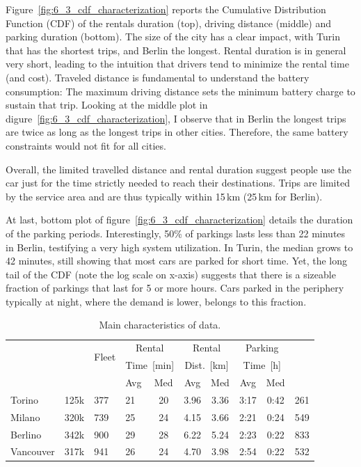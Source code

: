 Figure~\ref{fig:6_3_cdf_characterization} reports the Cumulative Distribution Function (CDF) of the rentals duration (top), driving distance (middle) and parking duration (bottom).
The size of the city has a clear impact, with Turin that has the shortest trips, and Berlin the longest. 
Rental duration is in general very short, leading to the intuition that drivers tend to minimize the rental time (and cost). Traveled distance is fundamental to understand the battery consumption: The maximum driving distance sets the minimum battery charge to sustain that trip. Looking at the middle plot in digure~\ref{fig:6_3_cdf_characterization}, I observe that in Berlin the longest trips are twice as long as the longest trips in other cities. Therefore, the same battery constraints would not fit for all cities. 

Overall, the limited travelled distance and rental duration suggest people use the car just for the time strictly needed to reach their destinations. Trips are limited by the service area and are thus typically within 15\,km (25\,km for Berlin).

At last, bottom plot of figure~\ref{fig:6_3_cdf_characterization} details the duration of the parking periods. Interestingly, 50\% of parkings lasts less than 22 minutes in Berlin, testifying a very high system utilization. In Turin, the median grows to 42 minutes, still showing that most cars are parked for short time. Yet, the long tail of the CDF (note the log scale on x-axis) suggests that there is a sizeable fraction of parkings that last for 5 or more hours. Cars parked in the periphery typically at night, where the demand is lower, belongs to this fraction.
\begin{table}[h!]
\begin{center}
\scriptsize
\caption{Main characteristics of data.\label{tab:6_3_summary}}
\setlength\tabcolsep{5pt} %
\begin{tabular}{|l|l|l|l|c|c|c|c|c|l|}
\hline
\!\multirow{3}{*}{City} &\!\multirow{3}{*}{Rental}\!& \multirow{2}{*}{Fleet} &  \multicolumn{2}{|c|}{Rental}  &  \multicolumn{2}{|c|}{Rental}  &  \multicolumn{2}{|c|}{Parking}  &\!\multirow{3}{*}{Zones}\!\\ 
 &  & \multirow{2}{*}{Size}  & \multicolumn{2}{|c|}{Time~[min]}  & \multicolumn{2}{|c|}{Dist.~[km]} & \multicolumn{2}{|c|}{Time~[h]} &    \\ \cline{4-9} %
 & &  &\!Avg\!&\!Med\!&\!Avg\!&\!Med\!&\!Avg\!&\!Med\!& \\ \hline
\hline
       \!Torino       & 125k & 377 & 21 & 20 & 3.96 & 3.36 & 3:17 & 0:42 & 261 \\ \hline
\!Milano       & 320k & 739 & 25 & 24 & 4.15 & 3.66 & 2:21 & 0:24 & 549 \\ \hline
\!Berlino      & 342k & 900 & 29 & 28 & 6.22 & 5.24 & 2:23 & 0:22 & 833 \\ \hline
\!Vancouver\!  & 317k & 941 & 26 & 24 & 4.70 & 3.98 & 2:54 & 0:22 & 532 \\ \hline

\end{tabular}
\end{center}
\end{table}


